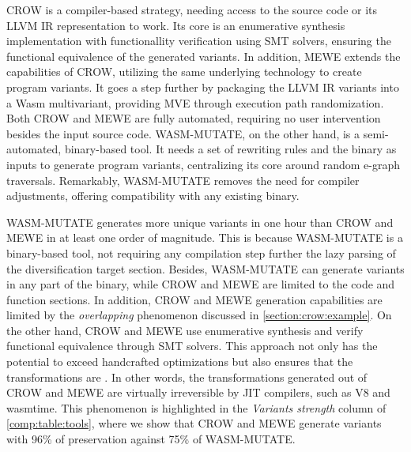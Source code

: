 CROW is a compiler-based strategy, needing access to the source code or its LLVM IR representation to work. 
Its core is an enumerative synthesis implementation with functionallity verification using SMT solvers, ensuring the functional equivalence of the generated variants.
In addition, MEWE extends the capabilities of CROW, utilizing the same underlying technology to create program variants. 
It goes a step further by packaging the LLVM IR variants into a Wasm multivariant, providing MVE through execution path randomization.
Both CROW and MEWE are fully automated, requiring no user intervention besides the input source code.
WASM-MUTATE, on the other hand, is a semi-automated, binary-based tool.
It needs a set of rewriting rules and the \wasm binary as inputs to generate program variants, centralizing its core around random e-graph traversals. 
Remarkably, WASM-MUTATE removes the need for compiler adjustments, offering compatibility with any existing \Wasm binary. 




WASM-MUTATE generates more unique variants in one hour than CROW and MEWE in at least one order of magnitude.
This is because WASM-MUTATE is a binary-based tool, not requiring any compilation step further the lazy parsing of the diversification target section.
Besides, WASM-MUTATE can generate variants in any part of the \wasm binary, while CROW and MEWE are limited to the code and function sections.
In addition, CROW and MEWE generation capabilities are limited by the \emph{overlapping} phenomenon discussed in \autoref{section:crow:example}.
On the other hand, CROW and MEWE use enumerative synthesis and verify functional equivalence through SMT solvers. 
This approach not only has the potential to exceed handcrafted optimizations \cite{Sasnauskas2017Souper:Superoptimizer} but also ensures that the transformations are . 
In other words, the transformations generated out of CROW and MEWE are virtually irreversible by JIT compilers, such as V8 and wasmtime.
This phenomenon is highlighted in the \emph{Variants strength} column of \autoref{comp:table:tools}, where we show that CROW and MEWE generate variants with 96\% of preservation against 75\% of WASM-MUTATE.

